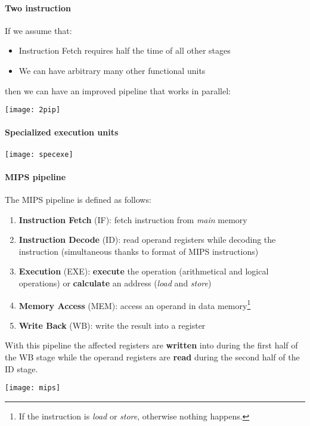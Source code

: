 \paragraph{Two instruction}
If we assume that:
\begin{itemize}
	\item Instruction Fetch requires half the time of all other stages
	\item We can have arbitrary many other functional units
\end{itemize}
then we can have an improved pipeline that works in parallel:
\begin{center}
	\texttt{[image: 2pip]}
\end{center}

\paragraph{Specialized execution units}
\begin{center}
	\texttt{[image: specexe]}
\end{center}

\paragraph{MIPS pipeline}
The MIPS pipeline is defined as follows:
\begin{enumerate}
	\item \textbf{Instruction Fetch} (IF): fetch instruction from \textit{main} memory
	\item \textbf{Instruction Decode} (ID): read operand registers while decoding the instruction (simultaneous thanks to format of MIPS instructions)
	\item \textbf{Execution} (EXE): \textbf{execute} the operation (arithmetical and logical operations) or \textbf{calculate} an address (\textit{load} and \textit{store})
	\item \textbf{Memory Access} (MEM): access an operand in data memory\footnote{If the instruction is \textit{load} or \textit{store}, otherwise nothing happens.}
	\item \textbf{Write Back} (WB): write the result into a register
\end{enumerate}
With this pipeline the affected registers are \textbf{written} into during the first half of the WB stage while the operand registers are \textbf{read} during the second half of the ID stage.

\begin{center}
	\texttt{[image: mips]}
\end{center}

